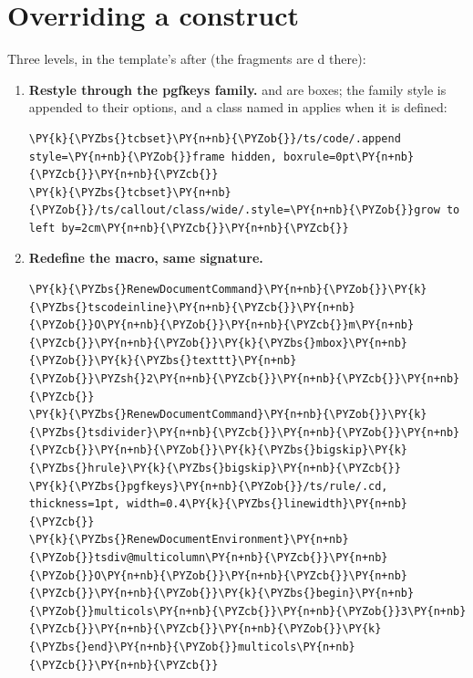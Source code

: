 \documentclass[a4paper,twoside]{article}
\begin{document}
\section{Overriding a construct}
Three levels, in the template's  after  (the
fragments are d there):
\begin{enumerate}
\item \textbf{Restyle through the pgfkeys family.}  and  are
 boxes; the family style is appended to their options, and a
class named in  applies  when it is
defined:
\begin{tscode}[lang=latex, engine=pygments]
\begin{Verbatim}[commandchars=\\\{\},breaklines, breakanywhere, commandchars=\\\{\}]
\PY{k}{\PYZbs{}tcbset}\PY{n+nb}{\PYZob{}}/ts/code/.append style=\PY{n+nb}{\PYZob{}}frame hidden, boxrule=0pt\PY{n+nb}{\PYZcb{}}\PY{n+nb}{\PYZcb{}}
\PY{k}{\PYZbs{}tcbset}\PY{n+nb}{\PYZob{}}/ts/callout/class/wide/.style=\PY{n+nb}{\PYZob{}}grow to left by=2cm\PY{n+nb}{\PYZcb{}}\PY{n+nb}{\PYZcb{}}
\end{Verbatim}
\end{tscode}
\item \textbf{Redefine the macro, same signature.}
\begin{tscode}[lang=latex, engine=pygments]
\begin{Verbatim}[commandchars=\\\{\},breaklines, breakanywhere, commandchars=\\\{\}]
\PY{k}{\PYZbs{}RenewDocumentCommand}\PY{n+nb}{\PYZob{}}\PY{k}{\PYZbs{}tscodeinline}\PY{n+nb}{\PYZcb{}}\PY{n+nb}{\PYZob{}}O\PY{n+nb}{\PYZob{}}\PY{n+nb}{\PYZcb{}}m\PY{n+nb}{\PYZcb{}}\PY{n+nb}{\PYZob{}}\PY{k}{\PYZbs{}mbox}\PY{n+nb}{\PYZob{}}\PY{k}{\PYZbs{}texttt}\PY{n+nb}{\PYZob{}}\PYZsh{}2\PY{n+nb}{\PYZcb{}}\PY{n+nb}{\PYZcb{}}\PY{n+nb}{\PYZcb{}}
\PY{k}{\PYZbs{}RenewDocumentCommand}\PY{n+nb}{\PYZob{}}\PY{k}{\PYZbs{}tsdivider}\PY{n+nb}{\PYZcb{}}\PY{n+nb}{\PYZob{}}\PY{n+nb}{\PYZcb{}}\PY{n+nb}{\PYZob{}}\PY{k}{\PYZbs{}bigskip}\PY{k}{\PYZbs{}hrule}\PY{k}{\PYZbs{}bigskip}\PY{n+nb}{\PYZcb{}}
\PY{k}{\PYZbs{}pgfkeys}\PY{n+nb}{\PYZob{}}/ts/rule/.cd, thickness=1pt, width=0.4\PY{k}{\PYZbs{}linewidth}\PY{n+nb}{\PYZcb{}}
\PY{k}{\PYZbs{}RenewDocumentEnvironment}\PY{n+nb}{\PYZob{}}tsdiv@multicolumn\PY{n+nb}{\PYZcb{}}\PY{n+nb}{\PYZob{}}O\PY{n+nb}{\PYZob{}}\PY{n+nb}{\PYZcb{}}\PY{n+nb}{\PYZcb{}}\PY{n+nb}{\PYZob{}}\PY{k}{\PYZbs{}begin}\PY{n+nb}{\PYZob{}}multicols\PY{n+nb}{\PYZcb{}}\PY{n+nb}{\PYZob{}}3\PY{n+nb}{\PYZcb{}}\PY{n+nb}{\PYZcb{}}\PY{n+nb}{\PYZob{}}\PY{k}{\PYZbs{}end}\PY{n+nb}{\PYZob{}}multicols\PY{n+nb}{\PYZcb{}}\PY{n+nb}{\PYZcb{}}

\end{Verbatim}
\end{tscode}
\end{enumerate}
\end{document}
